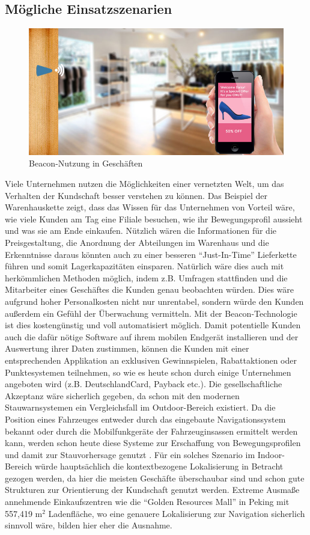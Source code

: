 \subsection{Mögliche Einsatzszenarien}
\begin{figure} 
\centering
\includegraphics[scale=0.3]{Bilder/iBeaconShoe}
\caption{Beacon-Nutzung in Geschäften \cite{Shoe}}
\label{fig:Shoe}
\end{figure}
Viele Unternehmen nutzen die Möglichkeiten einer vernetzten Welt, um das Verhalten der Kundschaft besser verstehen zu können. Das Beispiel der Warenhauskette zeigt, dass das Wissen für das Unternehmen von Vorteil wäre, wie viele Kunden am Tag eine Filiale besuchen, wie ihr Bewegungsprofil aussieht und was sie am Ende einkaufen. Nützlich wären die Informationen für die Preisgestaltung, die Anordnung der Abteilungen im Warenhaus und die Erkenntnisse daraus könnten auch zu einer besseren "`Just-In-Time"' Lieferkette führen und somit Lagerkapazitäten einsparen. Natürlich wäre dies auch mit herkömmlichen Methoden möglich, indem z.B. Umfragen stattfinden und die Mitarbeiter eines Geschäftes die Kunden genau beobachten würden. Dies wäre aufgrund hoher Personalkosten nicht nur unrentabel, sondern würde den Kunden außerdem ein Gefühl der Überwachung vermitteln. Mit der Beacon-Technologie ist dies kostengünstig und voll automatisiert möglich. Damit potentielle Kunden auch die dafür nötige Software auf ihrem mobilen Endgerät installieren und der Auswertung ihrer Daten zustimmen, können die Kunden mit einer entsprechenden Applikation an exklusiven Gewinnspielen, Rabattaktionen oder Punktesystemen teilnehmen, so wie es heute schon durch einige Unternehmen angeboten wird (z.B. DeutschlandCard, Payback etc.). Die gesellschaftliche Akzeptanz wäre sicherlich gegeben, da schon mit den modernen Stauwarnsystemen ein Vergleichsfall im Outdoor-Bereich existiert. Da die Position eines Fahrzeuges entweder durch das eingebaute Navigationssystem bekannt oder durch die Mobilfunkgeräte der Fahrzeuginsassen ermittelt werden kann, werden schon heute diese Systeme zur Erschaffung von Bewegungsprofilen und damit zur Stauvorhersage genutzt \cite{Stau}. Für ein solches Szenario im Indoor-Bereich würde hauptsächlich die kontextbezogene Lokalisierung in Betracht gezogen werden, da hier die meisten Geschäfte überschaubar sind und schon gute Strukturen zur Orientierung der Kundschaft genutzt werden. Extreme Ausmaße annehmende Einkaufszentren wie die "`Golden Resources Mall"' in Peking mit 557,419 $\text{m}^2$ Ladenfläche, wo eine genauere Lokalisierung zur Navigation sicherlich sinnvoll wäre, bilden hier eher die Ausnahme. \par\bigskip
